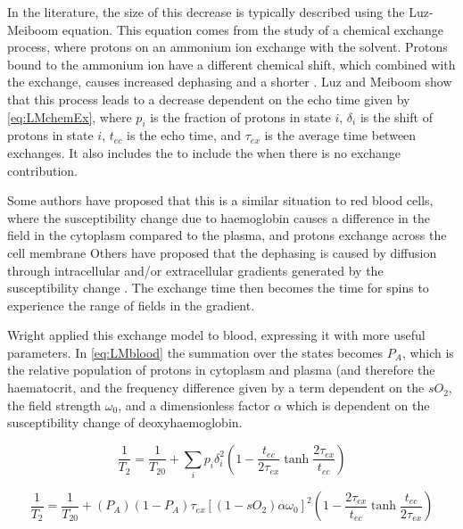 In the literature, the size of this decrease is typically described using the Luz-Meiboom equation.
This equation comes from the study of a chemical exchange process, where protons on an ammonium ion exchange with the solvent\cite{LuzNuclearMagneticResonance1963}.
Protons bound to the ammonium ion have a different chemical shift, which combined with the exchange, causes increased dephasing and a shorter \Ttwo.
Luz and Meiboom show that this process leads to a \Ttwo decrease dependent on the echo time given by \autoref{eq:LMchemEx}\cite{LuzNuclearMagneticResonance1963}, where $p_i$ is the fraction of protons in state $i$, $\delta_i$ is the shift of protons in state $i$, $t_{ec}$ is the echo time, and $\tau_{ex}$ is the average time between exchanges. It also includes the \TtwoO to include the \Ttwo when there is no exchange contribution.

Some authors have proposed that this is a similar situation to red blood cells, where the susceptibility change due to haemoglobin causes a difference in the field in the cytoplasm compared to the plasma, and protons exchange across the cell membrane\cite{BryantMagneticrelaxationblood1990}
Others have proposed that the dephasing is caused by diffusion through intracellular and/or extracellular gradients generated by the susceptibility change \cite{GomoriNMRRelaxationTimes1987,BrooksComparisont2relaxation1995,BrooksT2shorteningweaklymagnetized2001}.
The exchange time then becomes the time for spins to experience the range of fields in the gradient.

Wright\cite{WrightEstimatingoxygensaturation1991} applied this exchange model to blood, expressing it with more useful parameters. In \autoref{eq:LMblood} the summation over the states becomes $P_A$, which is the relative population of protons in cytoplasm and plasma (and therefore the haematocrit, and the frequency difference given by a term dependent on the $sO_2$, the field strength $\omega_0$, and a dimensionless factor $\alpha$ which is dependent on the susceptibility change of deoxyhaemoglobin.

\begin{equation}
\label{eq:LMchemEx}
\frac{1}{T_2} = \frac{1}{T_{20}} + \sum_i{p_i\delta_i^2} \left(1 - \frac{t_{ec}}{2\tau_{ex}} \tanh{ \frac{2\tau_{ex}}{t_{ec}} }\right)
\end{equation}

\begin{equation}
\label{eq:LMblood}
\frac{1}{T_2} = \frac{1}{T_{20}} + (P_A)(1 - P_A)\tau_{ex} \left[(1-sO_2)\alpha\omega_0\right]^2 \left(1 - \frac{2\tau_{ex}}{t_{ec}} \tanh{\frac{t_{ec}}{2\tau_{ex}} } \right)
\end{equation}

